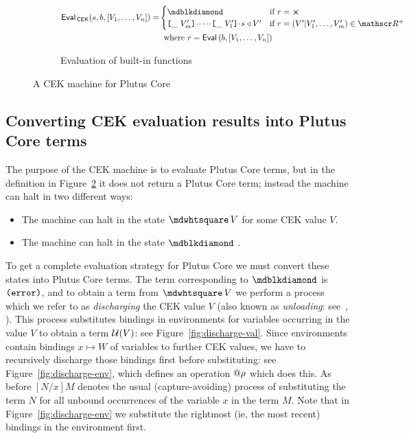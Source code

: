 \begin{figure}[H]
\bigskip
\begin{subfigure}[c]{\linewidth}
  \begin{align*}
 \EvalCEK(s, b, [V_1, \ldots, V_n]) =
  &   \begin{cases}
        \cekerror  & \text{if $r = \errorX$}\\
        \inAppLeftFrame{V^{\prime}_m} \cons \cdots \cons \inAppLeftFrame{V^{\prime}_1} \cons s \return V^{\prime}
          & \text{if $r = (V^{\prime}|V^{\prime}_1,\ldots,V^{\prime}_m) \in \R^{+}$}
      \end{cases}\\
  &  \;\;\text{where $r = \Eval\,(b,[V_1, \ldots, V_n])$}\\
   \end{align*}
  \caption{Evaluation of built-in functions}
  \label{fig:untyped-cek-builtins}
\end{subfigure}

  \caption{A CEK machine for Plutus Core}
\label{fig:untyped-cek-machine}
\end{figure}
  
\subsection{Converting CEK evaluation results into Plutus Core terms}
The purpose of the CEK machine is to evaluate Plutus Core terms, but in the
definition in Figure~\ref{fig:untyped-cek-machine} it does not return a Plutus
Core term; instead the machine can halt in two different ways:
\begin{itemize}
\item The machine can halt in the state $\cekhalt{V}$ for some CEK value $V$.
\item The machine can halt in the state $\cekerror{}$ .
\end{itemize}

\noindent To get a complete evaluation strategy for Plutus Core we must convert
these states into Plutus Core terms.  The term corresponding to $\cekerror{}$ is
$\texttt{(} \texttt{error} \texttt{)}$, and to obtain a term from $\cekhalt{V}$ we perform a process which we
refer to as \textit{discharging} the CEK value $V$ (also known as
\textit{unloading}: see~\cite[pp. 129--130]{Plotkin-cbn-cbv},
\cite[pp. 71ff]{Felleisen-pllc}).  This process substitutes bindings in
environments for variables occurring in the value $V$ to obtain a term
$\mathcal{U}(V)$: see Figure~\ref{fig:discharge-val}.  Since environments contain
bindings $x \mapsto W$ of variables to further CEK values, we have to
recursively discharge those bindings first before substituting: see
Figure~\ref{fig:discharge-env}, which defines an operation ${}@{\rho}$ which
does this.  As before $[N/x]M$ denotes the usual (capture-avoiding) process of
substituting the term $N$ for all unbound occurrences of the variable $x$ in the
term $M$. Note that in Figure~\ref{fig:discharge-env} we substitute the
rightmost (ie, the most recent) bindings in the environment first.


